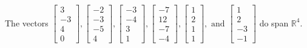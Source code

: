 \begin{exercise}
\begin{exerciseStatement}
  \end{exerciseStatement}
  \begin{exerciseAnswer}
   The vectors \(\left[\begin{array}{r}
3 \\
-3 \\
4 \\
0
\end{array}\right] , \left[\begin{array}{r}
-2 \\
-3 \\
-5 \\
4
\end{array}\right] , \left[\begin{array}{r}
-3 \\
-4 \\
3 \\
1
\end{array}\right] , \left[\begin{array}{r}
-7 \\
12 \\
-7 \\
-4
\end{array}\right] , \left[\begin{array}{r}
1 \\
2 \\
1 \\
1
\end{array}\right] , \text{ and } \left[\begin{array}{r}
1 \\
2 \\
-3 \\
-1
\end{array}\right]\) 
  	 do  
	span \(\mathbb{R}^4\).
  


  \end{exerciseAnswer}
\end{exercise}